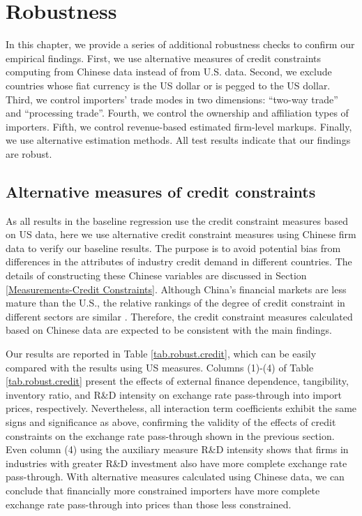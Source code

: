 \section{Robustness} \label{Robustness}

In this chapter, we provide a series of additional robustness checks to confirm our empirical findings. First, we use alternative measures of credit constraints computing from Chinese data instead of from U.S. data. Second, we exclude countries whose fiat currency is the US dollar or is pegged to the US dollar. Third, we control importers' trade modes in two dimensions: ``two-way trade'' and ``processing trade''. Fourth, we control the ownership and affiliation types of importers. Fifth, we control revenue-based estimated firm-level markups. Finally, we use alternative estimation methods. All test results indicate that our findings are robust.

\subsection{Alternative measures of credit constraints}

As all results in the baseline regression use the credit constraint measures based on US data, here we use alternative credit constraint measures using Chinese firm data to verify our baseline results. The purpose is to avoid potential bias from differences in the attributes of industry credit demand in different countries. The details of constructing these Chinese variables are discussed in Section \ref{Measurements-Credit Constraints}. Although China's financial markets are less mature than the U.S., the relative rankings of the degree of credit constraint in different sectors are similar \citep{manova2013}. Therefore, the credit constraint measures calculated based on Chinese data are expected to be consistent with the main findings. 

Our results are reported in Table \ref{tab.robust.credit}, which can be easily compared with the results using US measures. Columns (1)-(4) of Table \ref{tab.robust.credit} present the effects of external finance dependence, tangibility, inventory ratio, and R\&D intensity on exchange rate pass-through into import prices, respectively. Nevertheless, all interaction term coefficients exhibit the same signs and significance as above, confirming the validity of the effects of credit constraints on the exchange rate pass-through shown in the previous section. Even column (4) using the auxiliary measure R\&D intensity shows that firms in industries with greater R\&D investment also have more complete exchange rate pass-through. With alternative measures calculated using Chinese data, we can conclude that financially more constrained importers have more complete exchange rate pass-through into prices than those less constrained.

